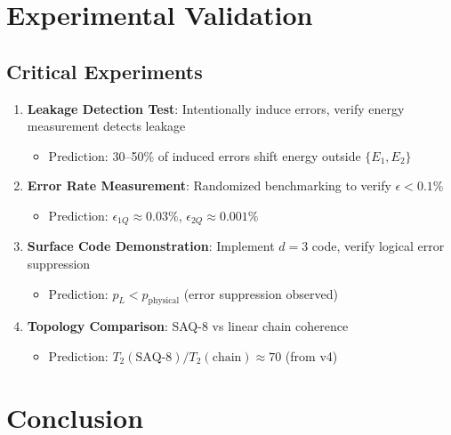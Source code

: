 \documentclass[11pt,a4paper]{article}
\theoremstyle{definition}
\begin{document}
\section{Experimental Validation}

\subsection{Critical Experiments}

\begin{enumerate}
    \item \textbf{Leakage Detection Test}: Intentionally induce errors, verify energy measurement detects leakage
    \begin{itemize}
        \item Prediction: 30--50\% of induced errors shift energy outside $\{E_1, E_2\}$
    \end{itemize}
    
    \item \textbf{Error Rate Measurement}: Randomized benchmarking to verify $\epsilon < 0.1\%$
    \begin{itemize}
        \item Prediction: $\epsilon_{1Q} \approx 0.03\%$, $\epsilon_{2Q} \approx 0.001\%$
    \end{itemize}
    
    \item \textbf{Surface Code Demonstration}: Implement $d=3$ code, verify logical error suppression
    \begin{itemize}
        \item Prediction: $p_L < p_{\text{physical}}$ (error suppression observed)
    \end{itemize}
    
    \item \textbf{Topology Comparison}: SAQ-8 vs linear chain coherence
    \begin{itemize}
        \item Prediction: $T_2(\text{SAQ-8})/T_2(\text{chain}) \approx 70$ (from v4)
    \end{itemize}
\end{enumerate}

\section{Conclusion}
\end{document}
